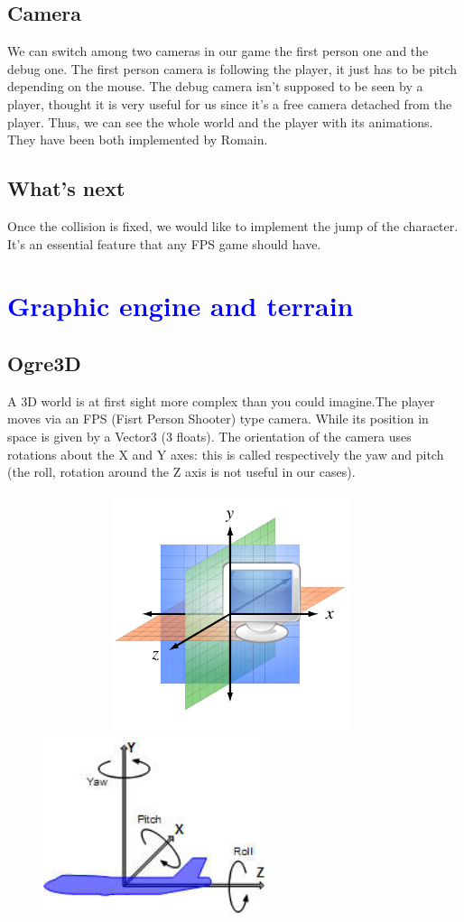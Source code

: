 \documentclass[article]{report} %
\begin{document}
			\section{Camera}
				We can switch among two cameras in our game the first person one and the debug one. The first person camera is following the player, it just has to be pitch depending on the mouse. The debug camera isn't supposed to be seen by a player, thought it is very useful for us since it's a free camera detached from the player. Thus, we can see the whole world and the player with its animations. They have been both implemented by Romain.

			\section{What's next}
				Once the collision is fixed, we would like to implement the jump of the character. It's an essential feature that any \ac{FPS} game should have.
		\chapter{\textcolor{blue}{Graphic engine and terrain}}
			\section{Ogre3D}
				A 3D world is at first sight more complex than you could imagine.The player moves via an FPS (Fisrt Person Shooter) type camera. While its position in space is given by a Vector3 (3 floats). The orientation of the camera uses rotations about the X and Y axes: this is called respectively the yaw and pitch (the roll, rotation around the Z axis is not useful in our cases).
			\begin{figure}[h]
				\includegraphics[width=11cm,   height=7cm]{Images/axis.png}
				\includegraphics[width=6.5cm]{Images/Rotations.jpeg}
			\end{figure}
			
\end{document}
